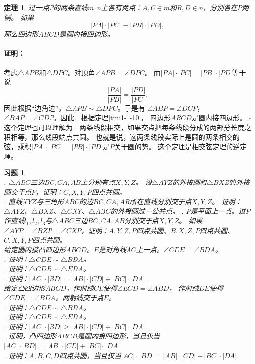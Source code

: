 \documentclass[12pt,UTF8]{ctexbook}
\newtheorem{tm}{定理}[section]
\newtheorem{xt}{习题}[section]
\renewenvironment{proof}{\paragraph{\textbf{证明：}}}{\hfill$\square$}
\begin{document}
\begin{tm}\label{tm:1-1-20}
    过一点$P$的两条直线$m,n$上各有两点：$A, C\in m$和$B, D \in n$，分别各在$P$两侧。
    如果
    $$ |PA| \cdot |PC| = |PB| \cdot |PD|, $$
    那么四边形$ABCD$是圆内接四边形。
\end{tm}

\begin{proof}
    考虑$\triangle APB$和$\triangle DPC$。对顶角$\angle APB = \angle DPC$。
    而$ |PA| \cdot |PC| = |PB| \cdot |PD|$等于说
    $$ \frac{|PA|}{|PB|} = \frac{|PD|}{|PC|}.$$
    因此根据“边角边”，$\triangle APB \sim \triangle DPC$。于是有
    $\angle ABP = \angle DCP$，$\angle BAP = \angle CDP$。因此，根据定理\ref{tm:1-1-10}，
    四边形$ABCD$是圆内接四边形。
\end{proof}
这个定理也可以理解为：两条线段相交，如果交点把每条线段分成的两部分长度之积相等，那么线段端点共圆。
也就是说，这两条线段实际上是圆的两条相交的弦，乘积$ |PA| \cdot |PC| = |PB| \cdot |PD|$是$P$关于圆的势。
这个定理是相交弦定理的逆定理。

\begin{xt}\label{xt:1-1-10}
    \mbox{}\\
    . $\triangle ABC$三边$BC,CA,AB$上分别有点$X,Y,Z$。
    设$\triangle AYZ$的外接圆和$\triangle BXZ$的外接圆交于点$P$，证明：$C,X,Y,P$四点共圆。\\
    . 直线$XYZ$与三角形$ABC$的边$BC,CA,AB$所在直线分别交于点$X,Y,Z$。
    证明：$\triangle AYZ$、$\triangle BXZ$、$\triangle CXY$、$\triangle ABC$的外接圆过一公共点。
    . $P$是平面上一点。过$P$作直线$l_1,l_2,l_3$与$\triangle ABC$三边$BC,CA,AB$分别交于点$X,Y,Z$。
    如果$\angle AYP = \angle BZP = \angle CXP$，证明：$A, Y, Z, P$四点共圆、$B, X, Z, P$四点共圆、$C,X,Y,P$四点共圆。\\
    给定圆内接凸四边形$ABCD$。$E$是对角线$AC$上一点。$\angle CDE = \angle BDA$。\\
    . 证明：$\triangle CDE \sim \triangle BDA$。\\
    . 证明：$\triangle CDB \sim \triangle EDA$。\\
    . 证明：$|AC| \cdot |BD| = |AB| \cdot |CD| + |BC| \cdot |DA|.$\\
    给定凸四边形$ABCD$，作射线$CE$使得$\angle ECD = \angle ABD$，
    作射线$DE$使得$\angle CDE = \angle BDA$。两射线交于点$E$。\\
    . 证明：$\triangle CDE \sim \triangle BDA$。\\
    . 证明：$\triangle CDB \sim \triangle EDA$。\\
    . 证明：$|AC| \cdot |BD| \geqslant |AB| \cdot |CD| + |BC| \cdot |DA|.$ \\
    . 证明，凸四边形$ABCD$是圆内接四边形，当且仅当$|AC| \cdot |BD| = |AB| \cdot |CD| + |BC| \cdot |DA|.$\\
    . 证明：$A,B,C,D$四点共圆，当且仅当$|AC| \cdot |BD| = |AB| \cdot |CD| + |BC| \cdot |DA|.$
\end{xt}
\end{document}
